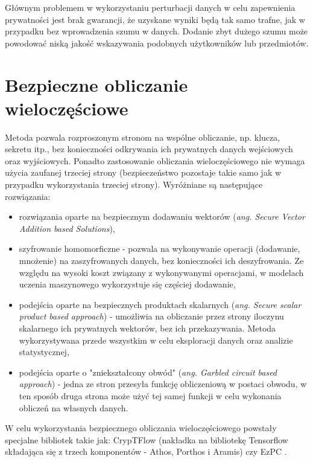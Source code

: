Głównym problemem w wykorzystaniu perturbacji danych w celu zapewnienia prywatności jest brak gwarancji, że uzyskane wyniki będą tak samo trafne, jak w przypadku bez wprowadzenia szumu w danych. Dodanie zbyt dużego szumu może powodować niską jakość wskazywania podobnych użytkowników lub przedmiotów.



\section{Bezpieczne obliczanie wieloczęściowe}

Metoda pozwala rozproszonym stronom na wspólne obliczanie, np. klucza, sekretu itp., bez konieczności odkrywania ich prywatnych danych wejściowych oraz wyjściowych. Ponadto zastosowanie obliczania wieloczęściowego nie wymaga użycia zaufanej trzeciej strony (bezpieczeństwo pozostaje takie samo jak w przypadku wykorzystania trzeciej strony). 
Wyróżniane są następujące rozwiązania:
\begin{itemize}
    \item rozwiązania oparte na bezpiecznym dodawaniu wektorów (\textit{ang. Secure Vector Addition based Solutions}),
    \item szyfrowanie homomorficzne - pozwala na wykonywanie operacji (dodawanie, mnożenie) na zaszyfrowanych danych, bez konieczności ich deszyfrowania. Ze względu na wysoki koszt związany z wykonywanymi operacjami, w modelach uczenia maszynowego wykorzystuje się częściej dodawanie,
    \item podejścia oparte na bezpiecznych produktach skalarnych (\textit{ang. Secure scalar product based approach}) - umożliwia na obliczanie przez strony iloczynu skalarnego ich prywatnych wektorów, bez ich przekazywania. Metoda wykorzystywana przede wszystkim w celu eksploracji danych oraz analizie statystycznej,
    \item podejścia oparte o "zniekształcony obwód" (\textit{ang. Garbled circuit based approach}) - jedna ze stron przesyła funkcję obliczeniową w postaci obwodu, w ten sposób druga strona może użyć tej samej funkcji w celu wykonania obliczeń na własnych danych.
\end{itemize}

W celu wykorzystania bezpiecznego obliczania wieloczęściowego powstały specjalne bibliotek takie jak: CrypTFlow (nakładka na bibliotekę Tensorflow składająca się z trzech komponentów - Athos, Porthos i Aramis) \cite{kumar2020cryptflow} czy EzPC \cite{chandran2019ezpc}.

